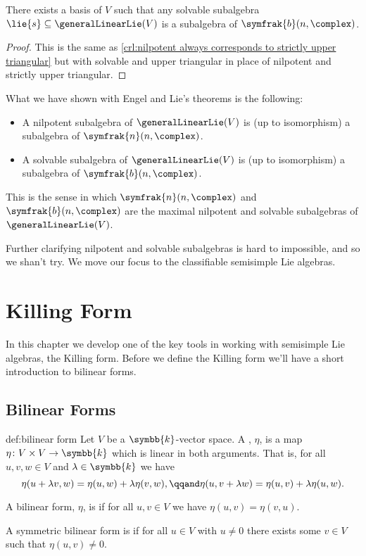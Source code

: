 \documentclass[fleqn]{NotesClass}
\renewcommand{\field}{\symbb{k}}
\newcommand{\borelLie}{\symfrak{b}}
\newcommand{\nilpotentLie}{\symfrak{n}}
\begin{document}
    \begin{crl}{}{}
        There exists a basis of \(V\) such that any solvable subalgebra \(\lie{s} \subseteq \generalLinearLie(V)\) is a subalgebra of \(\borelLie(n, \complex)\).
        \begin{proof}
            This is the same as \cref{crl:nilpotent always corresponds to strictly upper triangular} but with solvable and upper triangular in place of nilpotent and strictly upper triangular.
        \end{proof}
    \end{crl}
    
    What we have shown with Engel and Lie's theorems is the following:
    \begin{itemize}
        \item A nilpotent subalgebra of \(\generalLinearLie(V)\) is (up to isomorphism) a subalgebra of \(\nilpotentLie(n, \complex)\).
        \item A solvable subalgebra of \(\generalLinearLie(V)\) is (up to isomorphism) a subalgebra of \(\borelLie(n, \complex)\).
    \end{itemize}
    This is the sense in which \(\nilpotentLie(n, \complex)\) and \(\borelLie(n, \complex)\) are the maximal nilpotent and solvable subalgebras of \(\generalLinearLie(V)\).
    
    Further clarifying nilpotent and solvable subalgebras is hard to impossible, and so we shan't try.
    We move our focus to the classifiable semisimple Lie algebras.
    
    \chapter{Killing Form}
    In this chapter we develop one of the key tools in working with semisimple Lie algebras, the Killing form.
    Before we define the Killing form we'll have a short introduction to bilinear forms.
    
    \section{Bilinear Forms}
    \begin{dfn}{}{def:bilinear form}
        Let \(V\) be a \(\field\)-vector space.
        A , \(\eta\), is a map \(\eta \colon V \times V \to \field\) which is linear in both arguments.
        That is, for all \(u, v, w \in V\) and \(\lambda \in \field\) we have
        \begin{equation}
            \eta(u + \lambda v, w) = \eta(u, w) + \lambda \eta(v, w), \qqand \eta(u, v + \lambda w) = \eta(u, v) + \lambda \eta(u, w).
        \end{equation}
        
        A bilinear form, \(\eta\), is  if for all \(u, v \in V\) we have \(\eta(u, v) = \eta(v, u)\).
        
        A symmetric bilinear form is  if for all \(u \in V\) with \(u \ne 0\) there exists some \(v \in V\) such that \(\eta(u, v) \ne 0\).
    \end{dfn}
    
\end{document}
